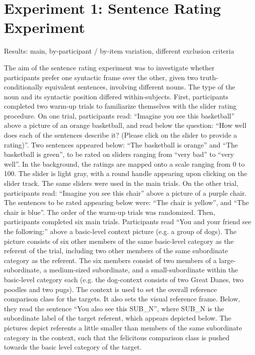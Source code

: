 \section{Experiment 1: Sentence Rating Experiment}

Results: main, by-participant / by-item variation, different exclusion criteria 

The aim of the sentence rating experiment was to investigate whether participants prefer one syntactic frame over the other, given two truth-conditionally equivalent sentences, involving different nouns. The type of the noun and its syntactic position differed within-subjects.
First, participants completed two warm-up trials to familiarize themselves with the slider rating procedure. On one trial, participants read: “Imagine you see this basketball” above a picture of an orange basketball, and read below the question: “How well does each of the sentences describe it? (Please click on the slider to provide a rating)”. Two sentences appeared below: “The basketball is orange” and “The basketball is green”, to be rated on sliders ranging from “very bad” to “very well”. In the background, the ratings are mapped onto a scale ranging from 0 to 100. The slider is light gray, with a round handle appearing upon clicking on the slider track. The same sliders were used in the main trials. On the other trial, participants read: “Imagine you see this chair” above a picture of a purple chair. The sentences to be rated appearing below were: “The chair is yellow”, and “The chair is blue”. The order of the warm-up trials was randomized.    
Then, participants completed six main trials. Participants read “You and your friend see the following:” above a basic-level context picture (e.g. a group of dogs). The picture consists of six other members of the same basic-level category as the referent of the trial, including two other members of the same subordinate category as the referent. The six members consist of two members of a large-subordinate, a medium-sized subordinate, and a small-subordinate within the basic-level category each (e.g. the dog-context consists of two Great Danes, two poodles and two pugs). The context is used to set the overall reference comparison class for the targets. It also sets the visual reference frame.
Below, they read the sentence “You also see this SUB\_N”, where SUB\_N is the subordinate label of the target referent, which appears depicted below. The pictures depict referents a little smaller than members of the same subordinate category in the context, such that the felicitous comparison class is pushed towards the basic level category of the target.
